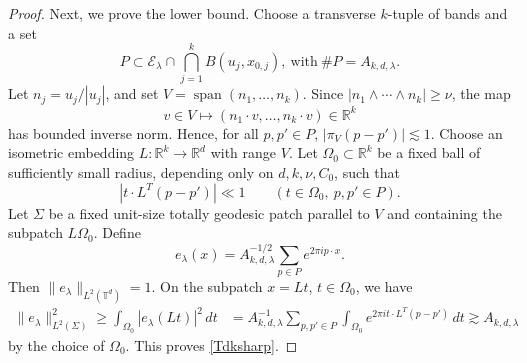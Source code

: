 \documentclass[11pt,reqno]{amsart}
\numberwithin{equation}{section}
\newcommand{\1}{\textbf{1}}
\newcommand{\ls}{\lesssim}
\newcommand{\la}{\lambda}
\newcommand{\E}{\mathcal{E}}
\begin{document}
\begin{proof}
		Next, we prove the lower bound. Choose a transverse \(k\)-tuple of bands and a set
		\[
		P\subset \E_\lambda\cap\bigcap_{j=1}^k B(u_j,x_{0,j}),\ \text{with}\  \#P=A_{k,d,\la}.
		\]
		Let \(n_j=u_j/|u_j|\), and set
		\(V=\operatorname{span}(n_1,\ldots,n_k)\).  Since
		\(|n_1\wedge\cdots\wedge n_k|\ge\nu\), the map
		\[
		v\in V\longmapsto (n_1\cdot v,\ldots,n_k\cdot v)\in\mathbb R^k
		\]
		has bounded inverse norm. Hence, for all
		\(p,p'\in P\), $|\pi_V(p-p')|\ls1.$
		Choose an isometric embedding \(L:\mathbb R^k\to\mathbb R^d\) with
		range \(V\).  Let \(\Omega_0\subset\mathbb R^k\) be a fixed ball of sufficiently
		small radius, depending only on \(d,k,\nu,C_0\), such that
		\[
		|t\cdot L^T(p-p')|\ll 1
		\qquad
		(t\in\Omega_0,\ p,p'\in P).
		\]
		Let \(\Sigma\) be a fixed unit-size totally geodesic patch parallel to \(V\)
		and containing the subpatch \(L\Omega_0\).  Define
		\[
		e_\lambda(x)=A_{k,d,\la}^{-1/2}\sum_{p\in P} e^{2\pi ip\cdot x}.
		\]
		Then $\|e_\la\|_{L^2(\mathbb{T}^d)}= 1$.
		On the subpatch \(x=Lt\), \(t\in\Omega_0\), we have
		\[
		\begin{aligned}
			\|e_\lambda\|_{L^2(\Sigma)}^2\ge	\int_{\Omega_0}|e_\lambda(Lt)|^2\,dt
			&=
			A_{k,d,\la}^{-1}\sum_{p,p'\in P}
			\int_{\Omega_0} e^{2\pi it\cdot L^T(p-p')}\,dt \gtrsim A_{k,d,\la}
		\end{aligned}
		\]
		by the choice of \(\Omega_0\).  
		This proves \eqref{Tdksharp}.
	\end{proof}
	
\end{document}
